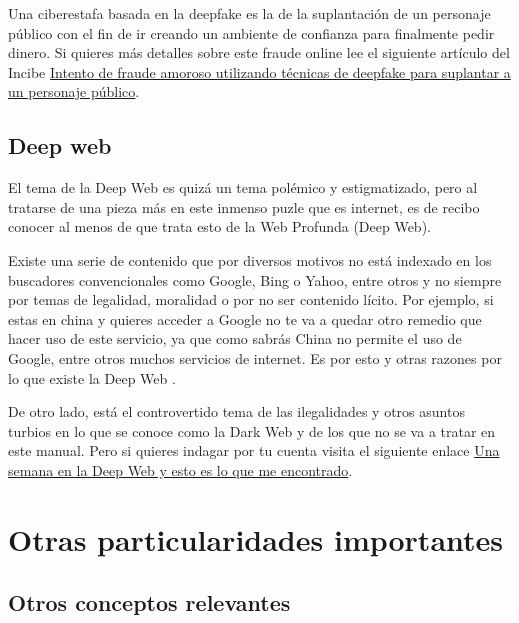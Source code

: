 \documentclass[
  a4paper,
  openany]{book}
\begin{document}
Una ciberestafa basada en la deepfake es la de la suplantación de un personaje público con el fin de ir creando un ambiente de confianza para finalmente pedir dinero. Si quieres más detalles sobre este fraude online lee el siguiente artículo del Incibe \href{https://www.incibe.es/linea-de-ayuda-en-ciberseguridad/casos-reales/intento-de-fraude-amoroso-utilizando-tecnicas-de-deepfake-para-suplantar-un-personaje-publico}{Intento de fraude amoroso utilizando técnicas de deepfake para suplantar a un personaje público}.

\hypertarget{deep-web}{%
\section{Deep web}\label{deep-web}}

El tema de la Deep Web es quizá un tema polémico y estigmatizado, pero al tratarse de una pieza más en este inmenso puzle que es internet, es de recibo conocer al menos de que trata esto de la Web Profunda (Deep Web).

Existe una serie de contenido que por diversos motivos no está indexado en los buscadores convencionales como Google, Bing o Yahoo, entre otros y no siempre por temas de legalidad, moralidad o por no ser contenido lícito. Por ejemplo, si estas en china y quieres acceder a Google no te va a quedar otro remedio que hacer uso de este servicio, ya que como sabrás China no permite el uso de Google, entre otros muchos servicios de internet. Es por esto y otras razones por lo que existe la Deep Web \citep{OSI-deep-web}.

De otro lado, está el controvertido tema de las ilegalidades y otros asuntos turbios en lo que se conoce como la Dark Web y de los que no se va a tratar en este manual. Pero si quieres indagar por tu cuenta visita el siguiente enlace \href{https://www.xataka.com/analisis/una-semana-en-la-deep-web-esto-es-lo-que-me-he-encontrado}{Una semana en la Deep Web y esto es lo que me encontrado}.

\hypertarget{otras-particularidades-importantes}{%
\chapter{Otras particularidades importantes}\label{otras-particularidades-importantes}}

\hypertarget{otros-conceptos-relevantes}{%
\section{Otros conceptos relevantes}\label{otros-conceptos-relevantes}}
\end{document}
